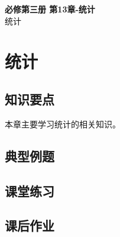 \documentclass[12pt,a4paper]{article}
\begin{document}
\begin{center}
\LARGE\textbf{必修第三册 第13章-统计} \\[0.5em]
\large 统计
\end{center}

\tableofcontents
\newpage

\section{统计}

\subsection{知识要点}
本章主要学习统计的相关知识。

\subsection{典型例题}

\subsection{课堂练习}

\subsection{课后作业}
\end{document}
